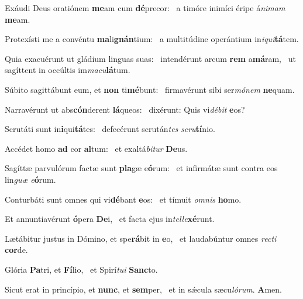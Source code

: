 \item Exáudi Deus oratiónem \textbf{me}am cum \textbf{dé}precor:~\psstar{} a timóre inimíci éripe á\textit{nimam} \textbf{me}am.
\item Protexísti me a convéntu \textbf{ma}li\textbf{gnán}tium:~\psstar{} a multitúdine operántium in\textit{iqui}\textbf{tá}tem.
\item Quia exacuérunt ut gládium linguas suas:~\pscross{} intendérunt arcum \textbf{rem} a\textbf{má}ram,~\psstar{} ut sagíttent in occúltis im\textit{macu}\textbf{lá}tum.
\item Súbito sagittábunt eum, et \textbf{non} ti\textbf{mé}bunt:~\psstar{} firmavérunt sibi ser\textit{mónem} \textbf{ne}quam.
\item Narravérunt ut abs\textbf{cón}derent \textbf{lá}queos:~\psstar{} dixérunt: Quis vi\textit{débit} \textbf{e}os?
\item Scrutáti sunt in\textbf{i}qui\textbf{tá}tes:~\psstar{} defecérunt scrután\textit{tes} \textit{scru}\textbf{tí}nio.
\item Accédet homo \textbf{ad} cor \textbf{al}tum:~\psstar{} et exaltá\textit{bitur} \textbf{De}us.
\item Sagíttæ parvulórum factæ sunt \textbf{pla}gæ e\textbf{ó}rum:~\psstar{} et infirmátæ sunt contra eos lin\textit{guæ} \textit{e}\textbf{ó}rum.
\item Conturbáti sunt omnes qui vi\textbf{dé}bant \textbf{e}os:~\psstar{} et tímuit \textit{omnis} \textbf{ho}mo.
\item Et annuntiavérunt \textbf{ó}pera \textbf{De}i,~\psstar{} et facta ejus in\textit{telle}\textbf{xé}runt.
\item Lætábitur justus in Dómino, et spe\textbf{rá}bit in \textbf{e}o,~\psstar{} et laudabúntur omnes \textit{recti} \textbf{cor}de.
\item Glória \textbf{Pa}tri, et \textbf{Fí}lio,~\psstar{} et Spirí\textit{tui} \textbf{Sanc}to.
\item Sicut erat in princípio, et \textbf{nunc}, et \textbf{sem}per,~\psstar{} et in sǽcula sæcu\textit{lórum}. \textbf{A}men.

